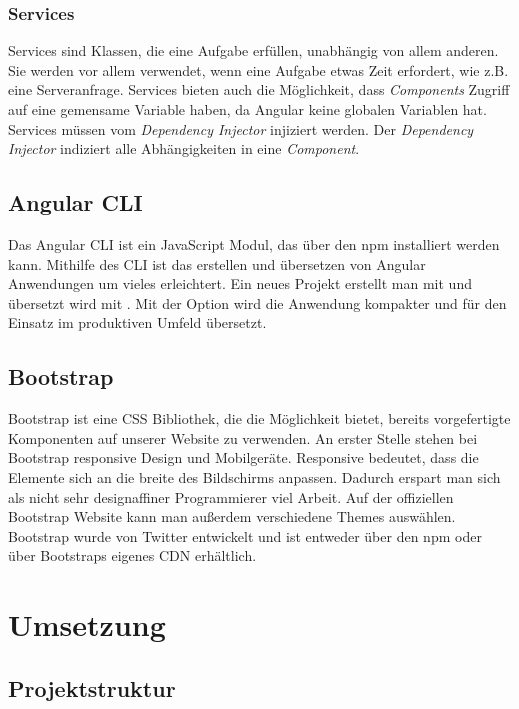 \subsubsection{Services}
\label{sec:ang-services}
Services sind Klassen, die eine Aufgabe erfüllen, unabhängig von allem anderen. Sie werden vor allem verwendet, wenn eine Aufgabe etwas Zeit erfordert, wie z.B. eine Serveranfrage. Services bieten auch die Möglichkeit, dass \textit{Components} Zugriff auf eine gemensame Variable haben, da Angular keine globalen Variablen hat. Services müssen vom \textit{Dependency Injector} injiziert werden. Der \textit{Dependency Injector} indiziert alle Abhängigkeiten in eine \textit{Component}.

\subsection{Angular CLI}
\label{sec:vor-angular-cli}
Das Angular \ac{CLI} ist ein JavaScript Modul, das über den \ac{npm} installiert werden kann. Mithilfe des \ac{CLI} ist das erstellen und übersetzen von Angular Anwendungen um vieles erleichtert. Ein neues Projekt erstellt man mit  und übersetzt wird mit . Mit der Option  wird die Anwendung kompakter und für den Einsatz im produktiven Umfeld übersetzt.

\subsection{Bootstrap}
\label{sec:vor-bootstrap}
Bootstrap ist eine CSS Bibliothek, die die Möglichkeit bietet, bereits vorgefertigte Komponenten auf unserer Website zu verwenden. An erster Stelle stehen bei Bootstrap responsive Design und Mobilgeräte. Responsive bedeutet, dass die Elemente sich an die breite des Bildschirms anpassen. Dadurch erspart man sich als nicht sehr designaffiner Programmierer viel Arbeit. Auf der offiziellen Bootstrap Website kann man außerdem verschiedene Themes auswählen. Bootstrap wurde von Twitter entwickelt und ist entweder über den \ac{npm} oder über Bootstraps eigenes \ac{CDN} erhältlich.

\section{Umsetzung}
\label{sec:umsetzung}

\subsection{Projektstruktur}
\label{sec:ums-projektstruktur}

